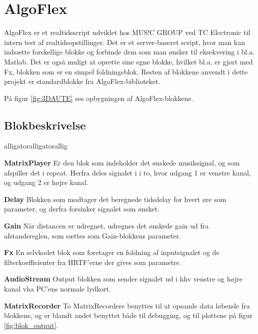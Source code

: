 \section{AlgoFlex}
\label{sec:AlgoFlex}

AlgoFlex er et realtidsscript udviklet hos MUS!C GROUP ved TC Electronic til intern test af realtidsopstillinger. Det er et server-baseret script, hvor man kan indsætte forskellige blokke og forbinde dem som man ønsker til eksekvering i bl.a. Matlab. Det er også muligt at oprette sine egne blokke, hvilket bl.a. er gjort med Fx, blokken som er en simpel foldningsblok. Resten af blokkene anvendt i dette projekt er standardblokke fra AlgoFlex-biblioteket.


På figur \ref{fig:3DAUTE} ses opbygningen af AlgoFlex-blokkene. 

\subsection{Blokbeskrivelse}

\begin{labeling}{alligatoralligatorallig}
	\item[\textbf{MatrixPlayer}] Er den blok som indeholder det ønskede musiksignal, og som afspiller det i repeat. Herfra deles signalet i i to, hvor udgang 1 er venstre kanal, og udgang 2 er højre kanal.
	\item[\textbf{Delay}] Blokken som modtager det beregnede tidsdelay for hvert øre som parameter, og derfra forsinker signalet som ønsket.
	\item [\textbf{Gain}] Når distancen er udregnet, udregnes det ønskede gain ud fra afstandsreglen, som sættes som Gain-blokkens parameter. 
	\item[\textbf{Fx}] En selvkodet blok som foretager en foldning af inputsignalet og de filterkoefficienter fra HRTF'erne der gives som parametre. 
	
	\item[\textbf{AudioStream}] Output blokken som sender signalet ud i hhv venstre og højre kanal vha PC'ens normale lydkort. 
	\item[\textbf{MatrixRecorder}] To MatrixRecordere benyttes til at opsamle data løbende fra blokkene, og er blandt andet benyttet både til debugging, og til plottene på figur \ref{fig:blok_output}.
	
\end{labeling}



